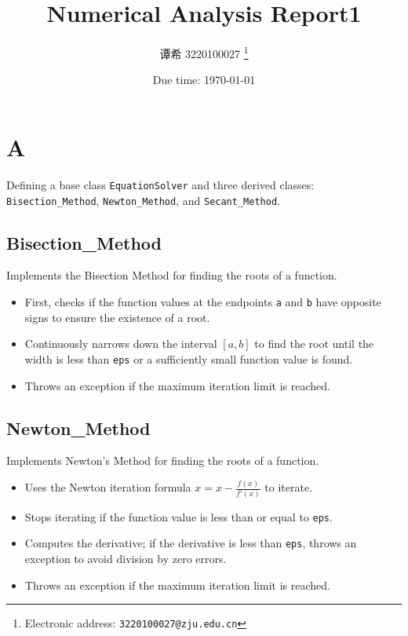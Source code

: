 \documentclass[a4paper]{article}
\begin{document}
\title{Numerical Analysis Report1}

\author{谭希 3220100027
  \thanks{Electronic address: \texttt{3220100027@zju.edu.cn}}}


\date{Due time: \today}

\maketitle

\section{A}
Defining a base class \texttt{EquationSolver} and three derived classes: \texttt{Bisection\_Method}, \texttt{Newton\_Method}, and \texttt{Secant\_Method}.\n

\subsection{Bisection\_Method}
Implements the Bisection Method for finding the roots of a function.

\begin{itemize}
    \item First, checks if the function values at the endpoints \texttt{a} and \texttt{b} have opposite signs to ensure the existence of a root.
    \item Continuously narrows down the interval \([a, b]\) to find the root until the width is less than \texttt{eps} or a sufficiently small function value is found.
    \item Throws an exception if the maximum iteration limit is reached.
\end{itemize}

\subsection{Newton\_Method}
Implements Newton's Method for finding the roots of a function.
\begin{itemize}
    \item Uses the Newton iteration formula \(x = x - \frac{f(x)}{f'(x)}\) to iterate.
    \item Stops iterating if the function value is less than or equal to \texttt{eps}.
    \item Computes the derivative; if the derivative is less than \texttt{eps}, throws an exception to avoid division by zero errors.
    \item Throws an exception if the maximum iteration limit is reached.
\end{itemize}
\end{document}
